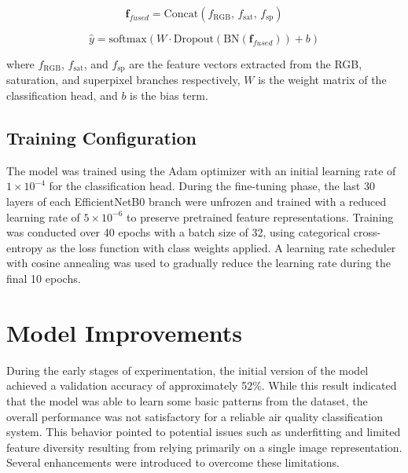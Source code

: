 \documentclass[conference]{IEEEtran}
\begin{document}
\begin{equation}
  \mathbf{f}_{fused} = \text{Concat}\!\left(f_{\text{RGB}},\, f_{\text{sat}},\, f_{\text{sp}}\right)
\end{equation}

\begin{equation}
  \hat{y} = \text{softmax}\!\left(W \cdot \text{Dropout}\!\left(\text{BN}(\mathbf{f}_{fused})\right) + b\right)
\end{equation}

where $f_{\text{RGB}}$, $f_{\text{sat}}$, and $f_{\text{sp}}$ are the feature
vectors extracted from the RGB, saturation, and superpixel branches
respectively, $W$ is the weight matrix of the classification head, and $b$
is the bias term.

\subsection{Training Configuration}

The model was trained using the Adam optimizer with an initial learning rate
of $1 \times 10^{-4}$ for the classification head. During the fine-tuning
phase, the last 30 layers of each EfficientNetB0 branch were unfrozen and
trained with a reduced learning rate of $5 \times 10^{-6}$ to preserve
pretrained feature representations. Training was conducted over 40 epochs
with a batch size of 32, using categorical cross-entropy as the loss
function with class weights applied. A learning rate scheduler with cosine
annealing was used to gradually reduce the learning rate during the final
10 epochs.

\section{Model Improvements}

During the early stages of experimentation, the initial version of the model
achieved a validation accuracy of approximately 52\%. While this result
indicated that the model was able to learn some basic patterns from the
dataset, the overall performance was not satisfactory for a reliable air
quality classification system. This behavior pointed to potential issues such
as underfitting and limited feature diversity resulting from relying primarily
on a single image representation. Several enhancements were introduced to
overcome these limitations.
\end{document}
